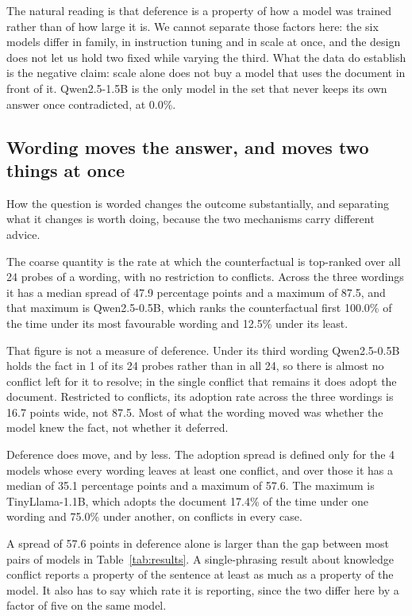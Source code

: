 \documentclass[10pt,conference]{IEEEtran}
\begin{document}
The natural reading is that deference is a property of how a model was trained rather than of how large it is. We cannot separate those factors here: the six models differ in family, in instruction tuning and in scale at once, and the design does not let us hold two fixed while varying the third. What the data do establish is the negative claim: scale alone does not buy a model that uses the document in front of it. Qwen2.5-1.5B is the only model in the set that never keeps its own answer once contradicted, at 0.0\%.

\subsection{Wording moves the answer, and moves two things at once}
\label{sec:phrasing}
How the question is worded changes the outcome substantially, and separating what it changes is worth doing, because the two mechanisms carry different advice.

The coarse quantity is the rate at which the counterfactual is top-ranked over all 24 probes of a wording, with no restriction to conflicts. Across the three wordings it has a median spread of 47.9 percentage points and a maximum of 87.5, and that maximum is Qwen2.5-0.5B, which ranks the counterfactual first 100.0\% of the time under its most favourable wording and 12.5\% under its least.

That figure is not a measure of deference. Under its third wording Qwen2.5-0.5B holds the fact in 1 of its 24 probes rather than in all 24, so there is almost no conflict left for it to resolve; in the single conflict that remains it does adopt the document. Restricted to conflicts, its adoption rate across the three wordings is 16.7 points wide, not 87.5. Most of what the wording moved was whether the model knew the fact, not whether it deferred.

Deference does move, and by less. The adoption spread is defined only for the 4 models whose every wording leaves at least one conflict, and over those it has a median of 35.1 percentage points and a maximum of 57.6. The maximum is TinyLlama-1.1B, which adopts the document 17.4\% of the time under one wording and 75.0\% under another, on conflicts in every case.

A spread of 57.6 points in deference alone is larger than the gap between most pairs of models in Table~\ref{tab:results}. A single-phrasing result about knowledge conflict reports a property of the sentence at least as much as a property of the model. It also has to say which rate it is reporting, since the two differ here by a factor of five on the same model.
\end{document}
